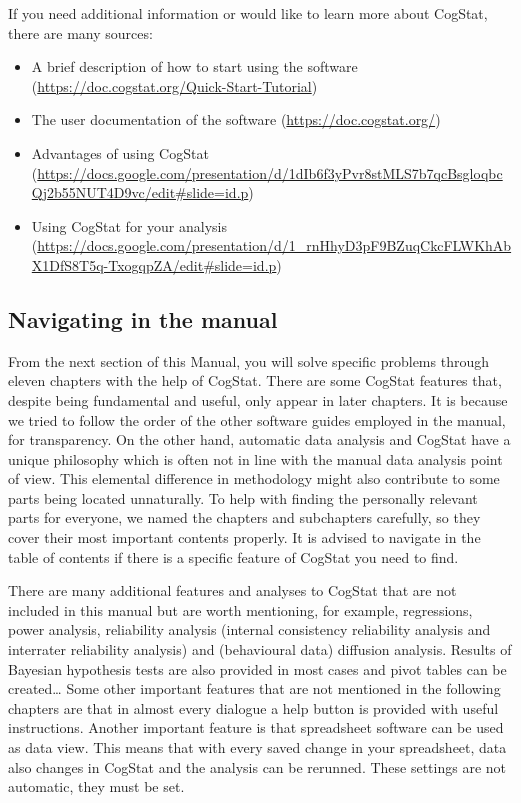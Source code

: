 \documentclass[
]{book}
\begin{document}
If you need additional information or would like to learn more about CogStat, there are many sources:

\begin{itemize}
\item
  A brief description of how to start using the software (\url{https://doc.cogstat.org/Quick-Start-Tutorial})
\item
  The user documentation of the software (\url{https://doc.cogstat.org/})
\item
  Advantages of using CogStat (\url{https://docs.google.com/presentation/d/1dIb6f3yPvr8stMLS7b7qcBsgloqbcQj2b55NUT4D9vc/edit\#slide=id.p})
\item
  Using CogStat for your analysis (\url{https://docs.google.com/presentation/d/1_rnHhyD3pF9BZuqCkcFLWKhAbX1DfS8T5q-TxogqpZA/edit\#slide=id.p})
\end{itemize}

\hypertarget{navigating-in-the-manual}{%
\subsection{Navigating in the manual}\label{navigating-in-the-manual}}

From the next section of this Manual, you will solve specific problems through eleven chapters with the help of CogStat. There are some CogStat features that, despite being fundamental and useful, only appear in later chapters. It is because we tried to follow the order of the other software guides employed in the manual, for transparency. On the other hand, automatic data analysis and CogStat have a unique philosophy which is often not in line with the manual data analysis point of view. This elemental difference in methodology might also contribute to some parts being located unnaturally. To help with finding the personally relevant parts for everyone, we named the chapters and subchapters carefully, so they cover their most important contents properly. It is advised to navigate in the table of contents if there is a specific feature of CogStat you need to find.

There are many additional features and analyses to CogStat that are not included in this manual but are worth mentioning, for example, regressions, power analysis, reliability analysis (internal consistency reliability analysis and interrater reliability analysis) and (behavioural data) diffusion analysis. Results of Bayesian hypothesis tests are also provided in most cases and pivot tables can be created\ldots{} Some other important features that are not mentioned in the following chapters are that in almost every dialogue a help button is provided with useful instructions. Another important feature is that spreadsheet software can be used as data view. This means that with every saved change in your spreadsheet, data also changes in CogStat and the analysis can be rerunned. These settings are not automatic, they must be set.
\end{document}
